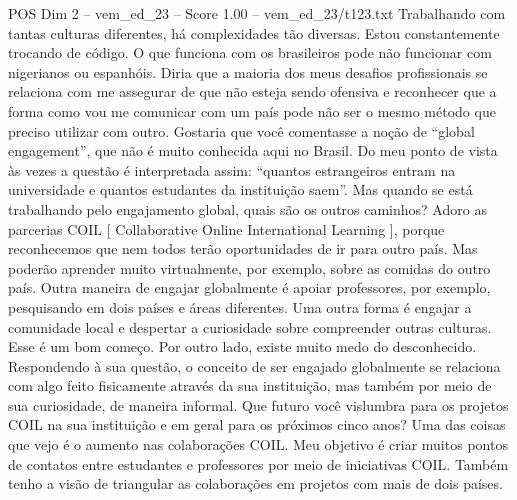 \begin{textsample}{POS Dim 2 – vem\_ed\_23 – Score 1.00 – vem\_ed\_23/t123.txt}
Trabalhando com tantas culturas diferentes, há complexidades tão diversas.
Estou constantemente trocando de código.
O que funciona com os brasileiros pode não funcionar com nigerianos ou espanhóis.
Diria que a maioria dos meus desafios profissionais se relaciona com me assegurar de que não esteja sendo ofensiva e reconhecer que a forma como vou me comunicar com um país pode não ser o mesmo método que preciso utilizar com outro.
Gostaria que você comentasse a noção de “global engagement”, que não é muito conhecida aqui no Brasil.
Do meu ponto de vista às vezes a questão é interpretada assim: “quantos estrangeiros entram na universidade e quantos estudantes da instituição saem”.
Mas quando se está trabalhando pelo engajamento global, quais são os outros caminhos?
Adoro as parcerias COIL [ Collaborative Online International Learning ], porque reconhecemos que nem todos terão oportunidades de ir para outro país.
Mas poderão aprender muito virtualmente, por exemplo, sobre as comidas do outro país.
Outra maneira de engajar globalmente é apoiar professores, por exemplo, pesquisando em dois países e áreas diferentes.
Uma outra forma é engajar a comunidade local e despertar a curiosidade sobre compreender outras culturas.
Esse é um bom começo.
Por outro lado, existe muito medo do desconhecido.
Respondendo à sua questão, o conceito de ser engajado globalmente se relaciona com algo feito fisicamente através da sua instituição, mas também por meio de sua curiosidade, de maneira informal.
Que futuro você vislumbra para os projetos COIL na sua instituição e em geral para os próximos cinco anos?
Uma das coisas que vejo é o aumento nas colaborações COIL.
Meu objetivo é criar muitos pontos de contatos entre estudantes e professores por meio de iniciativas COIL.
Também tenho a visão de triangular as colaborações em projetos com mais de dois países.

\end{textsample}

